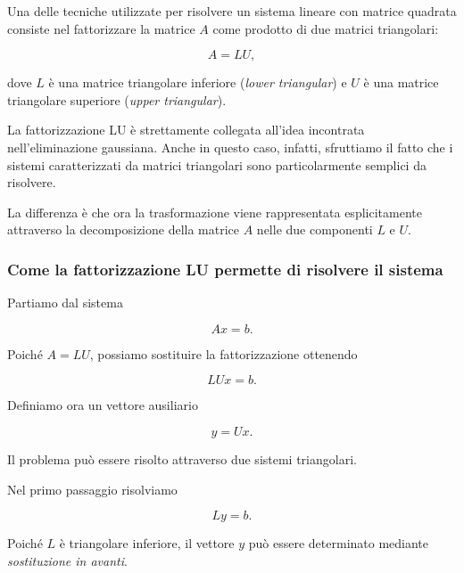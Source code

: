 Una delle tecniche utilizzate per risolvere un sistema lineare con
matrice quadrata consiste nel fattorizzare la matrice $A$ come
prodotto di due matrici triangolari:

\begin{equation*}
    A=LU,
    \label{eq:lu-factorization}
\end{equation*}

dove $L$ è una matrice triangolare inferiore
(\emph{lower triangular}) e $U$ è una matrice triangolare superiore
(\emph{upper triangular}).

La fattorizzazione LU è strettamente collegata all'idea incontrata
nell'eliminazione gaussiana. Anche in questo caso, infatti,
sfruttiamo il fatto che i sistemi caratterizzati da matrici
triangolari sono particolarmente semplici da risolvere.

La differenza è che ora la trasformazione viene rappresentata
esplicitamente attraverso la decomposizione della matrice $A$ nelle
due componenti $L$ e $U$.


\subsubsection{Come la fattorizzazione LU permette di risolvere il sistema}

Partiamo dal sistema

\begin{equation*}
    Ax=b.
\end{equation*}

Poiché $A=LU$, possiamo sostituire la fattorizzazione ottenendo

\begin{equation*}
    LUx=b.
\end{equation*}

Definiamo ora un vettore ausiliario

\begin{equation*}
    y=Ux.
\end{equation*}

Il problema può essere risolto attraverso due sistemi triangolari.

Nel primo passaggio risolviamo

\begin{equation*}
    Ly=b.
    \label{eq:forward-substitution}
\end{equation*}

Poiché $L$ è triangolare inferiore, il vettore $y$ può essere
determinato mediante \emph{sostituzione in avanti}.

